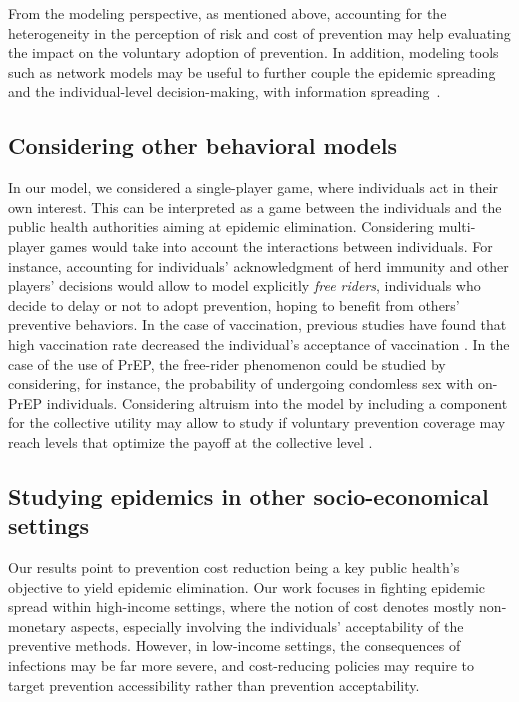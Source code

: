 From the modeling perspective, as mentioned above, accounting for the heterogeneity in the perception of risk and cost of prevention may help evaluating the impact on the voluntary adoption of prevention. In addition, modeling tools such as network models may be useful to further couple the epidemic spreading and the individual-level decision-making, with information spreading~\cite[]{Chang2020}.


\subsection{Considering other behavioral models}
In our model, we considered a single-player game, where individuals act in their own interest. This can be interpreted as a game between the individuals and the public health authorities aiming at epidemic elimination. Considering multi-player games would take into account the interactions between individuals. For instance, accounting for individuals' acknowledgment of herd immunity and other players' decisions would allow to model explicitly \textit{free riders}, individuals who decide to delay or not to adopt prevention, hoping to benefit from others' preventive behaviors. In the case of vaccination, previous studies have found that high vaccination rate decreased the individual's acceptance of vaccination \cite[]{Ibuka2014}. In the case of the use of PrEP, the free-rider phenomenon could be studied by considering, for instance, the probability of undergoing condomless sex with on-PrEP individuals. Considering altruism into the model by including a component for the collective utility may allow to study if voluntary prevention coverage may reach levels that optimize the payoff at the collective level \cite[]{Shim2012}. 


\subsection{Studying epidemics in other socio-economical settings}
Our results point to prevention cost reduction being a key public health's objective to yield epidemic elimination. Our work focuses in fighting epidemic spread within high-income settings, where the notion of cost denotes mostly non-monetary aspects, especially involving the individuals' acceptability of the preventive methods. However, in low-income settings, the consequences of infections may be far more severe, and cost-reducing policies may require to target prevention accessibility rather than prevention acceptability. 

